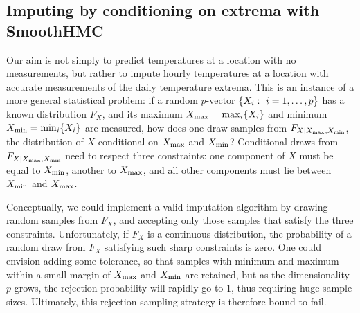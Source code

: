 \subsection{Imputing by conditioning on extrema with SmoothHMC}
\label{sec:smoothHMC}
    
Our aim is not simply to predict temperatures at a location with no measurements, but rather to impute hourly temperatures at a location with accurate measurements of the daily temperature extrema.
This is an instance of a more general statistical problem: if a random \(p\)-vector \(\left\lbrace X_i:~i=1,\dotsc,p\right\rbrace\) has a known distribution \(F_X\), and its maximum \(\Xmax = \max_i\cbr{X_i}\) and minimum \(\Xmin = \min_i\cbr{X_i}\) are measured, how does one draw samples from \(F_{X \mid X_{\max},X_{\min}}\), the distribution of \(X\) conditional on \(X_{\max}\) and \(X_{\min}\)?
Conditional draws from \(F_{X \mid X_{\max},X_{\min}}\) need to respect three constraints: one component of \(X\) must be equal to \(X_{\min}\), another to \(X_{\max}\), and all other components must lie between \(X_{\min}\) and \(X_{\max}\).

Conceptually, we could implement a valid imputation algorithm by drawing random samples from \(F_X\),
and accepting only those samples that satisfy the three constraints.
Unfortunately, if \(F_X\) is a continuous distribution, the probability of a random draw from \(F_X\) satisfying such sharp constraints is zero.
One could envision adding some tolerance, so that samples with minimum and maximum within a small margin of \(X_{\max}\) and \(X_{\min}\) are retained, but as the dimensionality \(p\) grows, the rejection probability will rapidly go to 1, thus requiring huge sample sizes.
Ultimately, this rejection sampling strategy is therefore bound to fail.

